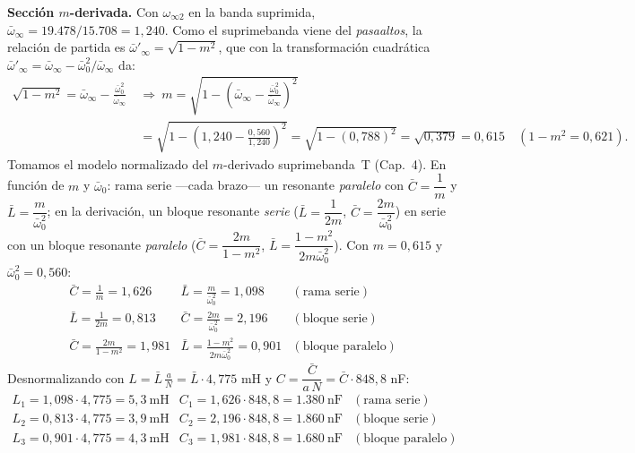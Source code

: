 \documentclass[class=article, crop=false, oneside]{standalone}
\begin{document}
\begin{figure}[H]
    \centering
    
\end{figure}

\noindent\textbf{Sección $m$-derivada.} Con $\omega_{\infty 2}$ en la banda suprimida,
$\bar\omega_\infty = 19.478/15.708 = 1{,}240$. Como el suprimebanda viene del
\emph{pasaaltos}, la relación de partida es $\bar\omega'_\infty = \sqrt{1-m^2}$, que con la
transformación cuadrática $\bar\omega'_\infty = \bar\omega_\infty - \bar\omega_0^2/\bar\omega_\infty$ da:
\[
\begin{aligned}
    \sqrt{1-m^2} = \bar\omega_\infty - \frac{\bar\omega_0^2}{\bar\omega_\infty}
    \ &\Rightarrow\
    m = \sqrt{1-\left(\bar\omega_\infty - \frac{\bar\omega_0^2}{\bar\omega_\infty}\right)^2}\\
    &= \sqrt{1-\left(1{,}240 - \frac{0{,}560}{1{,}240}\right)^2}
      = \sqrt{1-(0{,}788)^2} = \sqrt{0{,}379} = 0{,}615 \quad (1-m^2 = 0{,}621).
\end{aligned}
\]
Tomamos el modelo normalizado del $m$-derivado suprimebanda~T (Cap.~4). En función
de $m$ y $\bar\omega_0$: rama serie ---cada brazo--- un resonante \emph{paralelo} con
$\bar C=\dfrac{1}{m}$ y $\bar L=\dfrac{m}{\bar\omega_0^2}$; en la derivación, un bloque
resonante \emph{serie} ($\bar L=\dfrac{1}{2m}$, $\bar C=\dfrac{2m}{\bar\omega_0^2}$) en
serie con un bloque resonante \emph{paralelo} ($\bar C=\dfrac{2m}{1-m^2}$,
$\bar L=\dfrac{1-m^2}{2m\bar\omega_0^2}$). Con $m=0{,}615$ y $\bar\omega_0^2=0{,}560$:
\[
    \begin{array}{lll}
        \bar C=\tfrac{1}{m}=1{,}626 & \bar L=\tfrac{m}{\bar\omega_0^2}=1{,}098 & (\text{rama serie})\\[3pt]
        \bar L=\tfrac{1}{2m}=0{,}813 & \bar C=\tfrac{2m}{\bar\omega_0^2}=2{,}196 & (\text{bloque serie})\\[3pt]
        \bar C=\tfrac{2m}{1-m^2}=1{,}981 & \bar L=\tfrac{1-m^2}{2m\bar\omega_0^2}=0{,}901 & (\text{bloque paralelo})
    \end{array}
\]
Desnormalizando con $L=\bar L\,\tfrac{a}{N}=\bar L\cdot 4{,}775$ mH y $C=\dfrac{\bar C}{a\,N}=\bar C\cdot 848{,}8$ nF:
\[
    \begin{array}{lll}
        L_1 = 1{,}098\cdot 4{,}775 = 5{,}3\ \text{mH} & C_1 = 1{,}626\cdot 848{,}8 = 1.380\ \text{nF} & (\text{rama serie})\\[3pt]
        L_2 = 0{,}813\cdot 4{,}775 = 3{,}9\ \text{mH} & C_2 = 2{,}196\cdot 848{,}8 = 1.860\ \text{nF} & (\text{bloque serie})\\[3pt]
        L_3 = 0{,}901\cdot 4{,}775 = 4{,}3\ \text{mH} & C_3 = 1{,}981\cdot 848{,}8 = 1.680\ \text{nF} & (\text{bloque paralelo})
    \end{array}
\]
\end{document}
